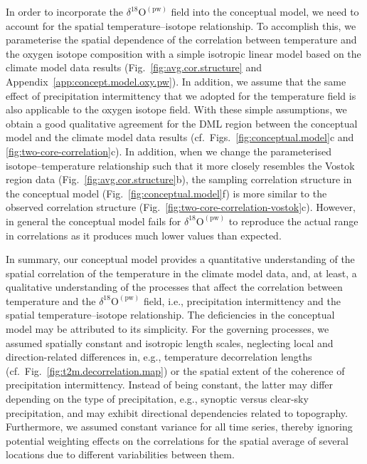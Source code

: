 \documentclass[cp, manuscript]{copernicus}
\begin{document}
In order to incorporate the $\delta^{18}\mathrm{O}^{\mathrm{(pw)}}$ field into
the conceptual model, we need to account for the spatial temperature--isotope
relationship. To accomplish this, we parameterise the spatial dependence of the
correlation between temperature and the oxygen isotope composition with a simple
isotropic linear model based on the climate model data results
(Fig.~\ref{fig:avg.cor.structure} and
Appendix~\ref{app:concept.model.oxy.pw}). In addition, we assume that the same
effect of precipitation intermittency that we adopted for the temperature field
is also applicable to the oxygen isotope field. With these simple assumptions,
we obtain a good qualitative agreement for the DML region between the conceptual
model and the climate model data results (cf.\
Figs.~\ref{fig:conceptual.model}c and \ref{fig:two-core-correlation}c). In
addition, when we change the parameterised isotope--temperature relationship
such that it more closely resembles the Vostok region data
(Fig.~\ref{fig:avg.cor.structure}b), the sampling correlation structure in the
conceptual model (Fig.~\ref{fig:conceptual.model}f) is more similar to the
observed correlation structure (Fig.~\ref{fig:two-core-correlation-vostok}c).
However, in general the conceptual model fails for
$\delta^{18}\mathrm{O}^{\mathrm{(pw)}}$ to reproduce the actual range in
correlations as it produces much lower values than expected.

In summary, our conceptual model provides a quantitative understanding of the
spatial correlation of the temperature in the climate model data, and, at least,
a qualitative understanding of the processes that affect the correlation between
temperature and the $\delta^{18}\mathrm{O}^{\mathrm{(pw)}}$ field, i.e.,
precipitation intermittency and the spatial temperature--isotope
relationship. The deficiencies in the conceptual model may be attributed to its
simplicity. For the governing processes, we assumed spatially constant and
isotropic length scales, neglecting local and direction-related differences in,
e.g., temperature decorrelation lengths
(cf.~Fig.~\ref{fig:t2m.decorrelation.map}) or the spatial extent of the
coherence of precipitation intermittency. Instead of being constant, the latter
may differ depending on the type of precipitation, e.g., synoptic versus
clear-sky precipitation, and may exhibit directional dependencies related to
topography. Furthermore, we assumed constant variance for all time series,
thereby ignoring potential weighting effects on the correlations for the spatial
average of several locations due to different variabilities between them.
\end{document}
